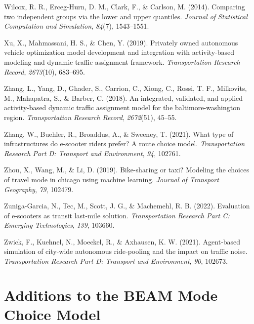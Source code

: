 \documentclass[fancy, masters]{byuthesis}
\newlength{\cslhangindent}
\newlength{\cslentryspacingunit} %
\newenvironment{CSLReferences}[2] %
 {%
  \setlength{\parindent}{0pt}
  \ifodd #1
  \let\oldpar\par
  \def\par{\hangindent=\cslhangindent\oldpar}
  \fi
  \setlength{\parskip}{#2\cslentryspacingunit}
 }%
 {}
\begin{document}
\begin{CSLReferences}{1}{0}
\leavevmode{}%
Wilcox, R. R., Erceg-Hurn, D. M., Clark, F., \& Carlson, M. (2014). Comparing two independent groups via the lower and upper quantiles. \emph{Journal of Statistical Computation and Simulation}, \emph{84}(7), 1543--1551.

\leavevmode{}%
Xu, X., Mahmassani, H. S., \& Chen, Y. (2019). Privately owned autonomous vehicle optimization model development and integration with activity-based modeling and dynamic traffic assignment framework. \emph{Transportation Research Record}, \emph{2673}(10), 683--695.

\leavevmode{}%
Zhang, L., Yang, D., Ghader, S., Carrion, C., Xiong, C., Rossi, T. F., Milkovits, M., Mahapatra, S., \& Barber, C. (2018). An integrated, validated, and applied activity-based dynamic traffic assignment model for the baltimore-washington region. \emph{Transportation Research Record}, \emph{2672}(51), 45--55.

\leavevmode{}%
Zhang, W., Buehler, R., Broaddus, A., \& Sweeney, T. (2021). What type of infrastructures do e-scooter riders prefer? A route choice model. \emph{Transportation Research Part D: Transport and Environment}, \emph{94}, 102761.

\leavevmode{}%
Zhou, X., Wang, M., \& Li, D. (2019). Bike-sharing or taxi? Modeling the choices of travel mode in chicago using machine learning. \emph{Journal of Transport Geography}, \emph{79}, 102479.

\leavevmode{}%
Zuniga-Garcia, N., Tec, M., Scott, J. G., \& Machemehl, R. B. (2022). Evaluation of e-scooters as transit last-mile solution. \emph{Transportation Research Part C: Emerging Technologies}, \emph{139}, 103660.

\leavevmode{}%
Zwick, F., Kuehnel, N., Moeckel, R., \& Axhausen, K. W. (2021). Agent-based simulation of city-wide autonomous ride-pooling and the impact on traffic noise. \emph{Transportation Research Part D: Transport and Environment}, \emph{90}, 102673.

\end{CSLReferences}

\hypertarget{appendix-appendix}{%
\appendix}


\hypertarget{apexA}{%
\chapter{Additions to the BEAM Mode Choice Model}\label{apexA}}
\end{document}
